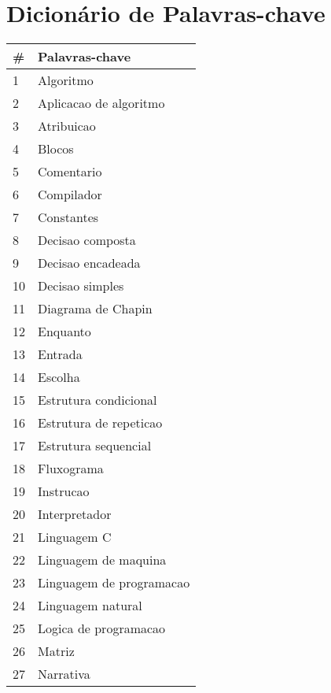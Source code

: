 \chapter{Dicionário de Palavras-chave}\label{ape:dicionario-palavras-chave}

\begin{longtable}{| p{} | p{} |}
\hline
\# & Palavras-chave            \\ \hline
1  & Algoritmo                 \\ \hline
2  & Aplicacao de algoritmo    \\ \hline
3  & Atribuicao                \\ \hline
4  & Blocos                    \\ \hline
5  & Comentario                \\ \hline
6  & Compilador                \\ \hline
7  & Constantes                \\ \hline
8  & Decisao composta          \\ \hline
9  & Decisao encadeada         \\ \hline
10 & Decisao simples           \\ \hline
11 & Diagrama de Chapin        \\ \hline
12 & Enquanto                  \\ \hline
13 & Entrada                   \\ \hline
14 & Escolha                   \\ \hline
15 & Estrutura condicional     \\ \hline
16 & Estrutura de repeticao    \\ \hline
17 & Estrutura sequencial      \\ \hline
18 & Fluxograma                \\ \hline
19 & Instrucao                 \\ \hline
20 & Interpretador             \\ \hline
21 & Linguagem C               \\ \hline
22 & Linguagem de maquina      \\ \hline
23 & Linguagem de programacao  \\ \hline
24 & Linguagem natural         \\ \hline
25 & Logica de programacao     \\ \hline
26 & Matriz                    \\ \hline
27 & Narrativa                 \\ \hline

\end{longtable}
